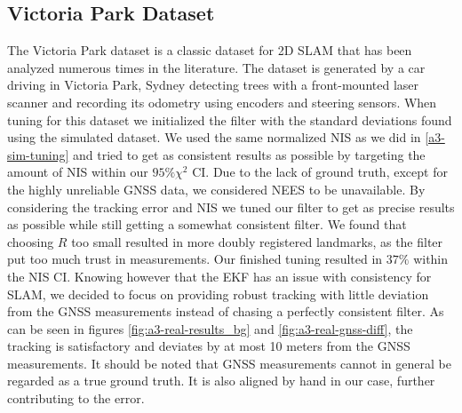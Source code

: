 \subsection{Victoria Park Dataset}
The Victoria Park dataset is a classic dataset for 2D SLAM that has been analyzed numerous times in the literature. The dataset is generated by a car driving in Victoria Park, Sydney detecting trees with a front-mounted laser scanner and recording its odometry using encoders and steering sensors. When tuning for this dataset we initialized the filter with the standard deviations found using the simulated dataset. We used the same normalized NIS as we did in \cref{a3-sim-tuning} and tried to get as consistent results as possible by targeting the amount of NIS within our $95\% \chi^2$ CI. Due to the lack of ground truth, except for the highly unreliable GNSS data, we considered NEES to be unavailable. By considering the tracking error and NIS we tuned our filter to get as precise results as possible while still getting a somewhat consistent filter. We found that choosing $R$ too small resulted in more doubly registered landmarks, as the filter put too much trust in measurements. Our finished tuning resulted in $37\%$ within the NIS CI. Knowing however that the EKF has an issue with consistency for SLAM, we decided to focus on providing robust tracking with little deviation from the GNSS measurements instead of chasing a perfectly consistent filter. As can be seen in figures \ref{fig:a3-real-results_bg} and \ref{fig:a3-real-gnss-diff}, the tracking is satisfactory and deviates by at most 10 meters from the GNSS measurements. It should be noted that GNSS measurements cannot in general be regarded as a true ground truth. It is also aligned by hand in our case, further contributing to the error.
